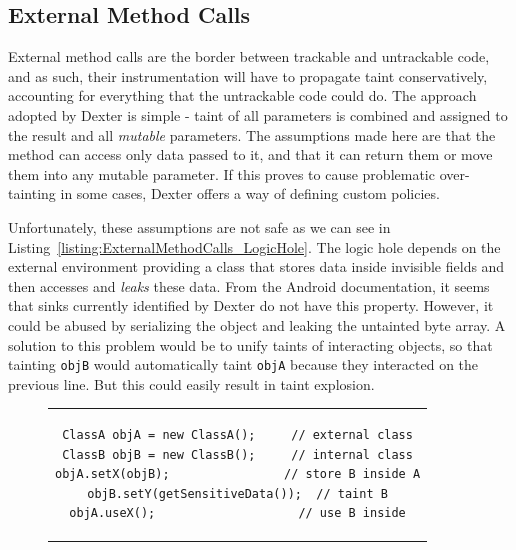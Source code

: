 \documentclass[12pt,twoside,notitlepage]{report}
\begin{document}
\subsection{External Method Calls}
\label{section:TaintPropagation_MethodCalls_External}

External method calls are the border between trackable and untrackable code, and as such, their instrumentation will have to propagate taint conservatively, accounting for everything that the untrackable code could do. The approach adopted by Dexter is simple - taint of all parameters is combined and assigned to the result and all \emph{mutable} parameters. The assumptions made here are that the method can access only data passed to it, and that it can return them or move them into any mutable parameter. If this proves to cause problematic over-tainting in some cases, Dexter offers a way of defining custom policies.

Unfortunately, these assumptions are not safe as we can see in Listing~\ref{listing:ExternalMethodCalls_LogicHole}. The logic hole depends on the external environment providing a class that stores data inside invisible fields and then accesses and \emph{leaks} these data. From the Android documentation, it seems that sinks currently identified by Dexter do not have this property. However, it could be abused by serializing the object and leaking the untainted byte array. A solution to this problem would be to unify taints of interacting objects, so that tainting \verb$objB$ would automatically taint \verb$objA$ because they interacted on the previous line. But this could easily result in taint explosion.

\begin{figure}[H]
	\centering
	\begin{tabular}{c}
	\begin{lstlisting}
ClassA objA = new ClassA();     // external class
ClassB objB = new ClassB();     // internal class
objA.setX(objB);                // store B inside A
objB.setY(getSensitiveData());  // taint B
objA.useX();                    // use B inside
	\end{lstlisting}
	\end{tabular}
	\begin{lstlisting}[caption={Example of a propagation logic hole},
	                   label={listing:ExternalMethodCalls_LogicHole}]
	\end{lstlisting}
\end{figure}
\end{document}
